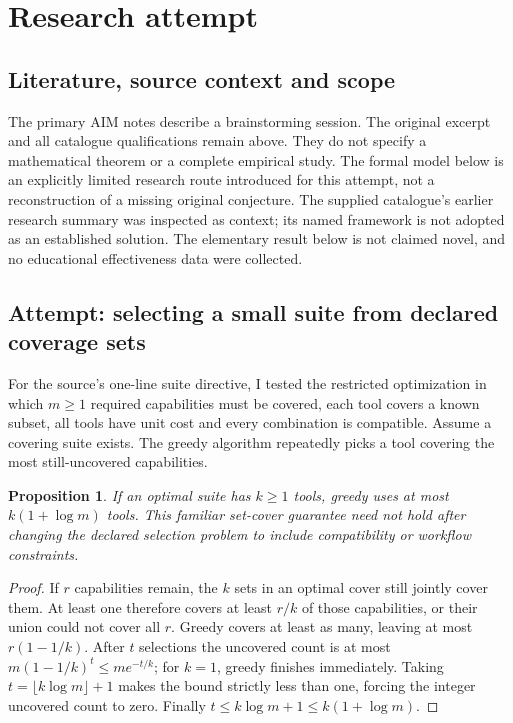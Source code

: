 \documentclass[11pt]{article}
\newtheorem{proposition}{Proposition}
\begin{document}
\section{Research attempt}
\subsection{Literature, source context and scope}
The primary AIM notes describe a brainstorming session. The original excerpt and all catalogue qualifications remain above. They do not specify a mathematical theorem or a complete empirical study. The formal model below is an explicitly limited research route introduced for this attempt, not a reconstruction of a missing original conjecture. The supplied catalogue's earlier research summary was inspected as context; its named framework is not adopted as an established solution. The elementary result below is not claimed novel, and no educational effectiveness data were collected.

\subsection{Attempt: selecting a small suite from declared coverage sets}
For the source's one-line suite directive, I tested the restricted optimization in which $m\ge1$ required capabilities must be covered, each tool covers a known subset, all tools have unit cost and every combination is compatible. Assume a covering suite exists. The greedy algorithm repeatedly picks a tool covering the most still-uncovered capabilities.
\begin{proposition}
If an optimal suite has $k\ge1$ tools, greedy uses at most $k(1+\log m)$ tools. This familiar set-cover guarantee need not hold after changing the declared selection problem to include compatibility or workflow constraints.
\end{proposition}
\begin{proof}
If $r$ capabilities remain, the $k$ sets in an optimal cover still jointly cover them. At least one therefore covers at least $r/k$ of those capabilities, or their union could not cover all $r$. Greedy covers at least as many, leaving at most $r(1-1/k)$. After $t$ selections the uncovered count is at most $m(1-1/k)^t\le m e^{-t/k}$; for $k=1$, greedy finishes immediately. Taking $t=\lfloor k\log m\rfloor+1$ makes the bound strictly less than one, forcing the integer uncovered count to zero. Finally $t\le k\log m+1\le k(1+\log m)$.
\end{proof}
\end{document}
